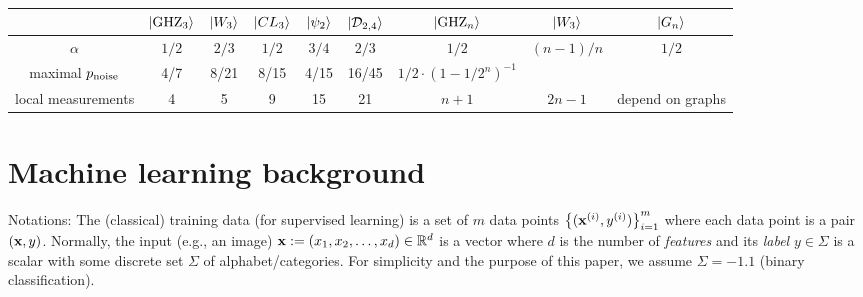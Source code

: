 \begin{table}[!ht]
\centering
\begin{tabular}{c|c|c|c|c|c|c|c|c}
	 & $\ket{\text{GHZ}_3}$ & $\ket{W_3}$ & $\ket{CL_3}$ & $\ket{\psi_2}$ & $\ket{\mathcal{D}_{2,4}}$ & $\ket{\text{GHZ}_n}$ & $\ket{W_3}$ & $\ket{G_n}$ \\
	\hline
	$\alpha$ & $1/2$ & $2/3$ & $1/2$ & $3/4$ & $2/3$ & $1/2$ & $(n-1)/n$ & $1/2$ \\
	maximal $p_{\text{noise}}$ & 4/7 & 8/21 & 8/15 & 4/15 & 16/45 & $1/2 \cdot (1-1/2^n)^{-1}$ & & \\
	local measurements & 4 & 5 & 9 & 15 & 21 & $n+1$ & $2n-1$ & depend on graphs \\
	\hline
\end{tabular}
\caption{\cite{guhneEntanglementDetection2009}}
\end{table}

\section{Machine learning background}


Notations:
The (classical) training data (for supervised learning) is a set of $m$ data points $\qty{(\vb{x}^{(i)}, y^{(i)})}^{m}_{i=1}$ 
where each data point is a pair $(\vb{x},y)$.
Normally, the input (e.g., an image) $\vb{x}:= (x_1,x_2,\dots,x_d) \in \mathbb{R}^d$  is a vector where $d$ is the number of \emph{features}
and its \emph{label} $y\in\Sigma$ is a scalar with some discrete set $\Sigma$ of alphabet/categories. 
For simplicity and the purpose of this paper, we assume $\Sigma=\qty{-1,1}$ (binary classification).



